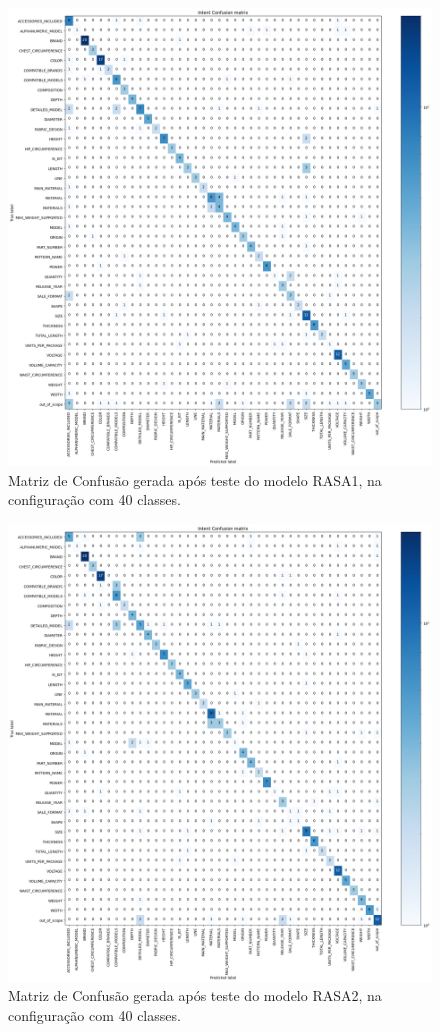 \begin{figure}[!ht]
    \centering
	\includegraphics[width=1\linewidth]{figuras/RASA1.png}
	\caption{Matriz de Confusão gerada após teste do modelo RASA1, na configuração com 40 classes.}
	\label{fig:matriz_rasa1}
\end{figure}

\begin{figure}[!ht]
    \centering
	\includegraphics[width=1\linewidth]{figuras/RASA2.png}
	\caption{Matriz de Confusão gerada após teste do modelo RASA2, na configuração com 40 classes.}
	\label{fig:matriz_rasa2}
\end{figure}

